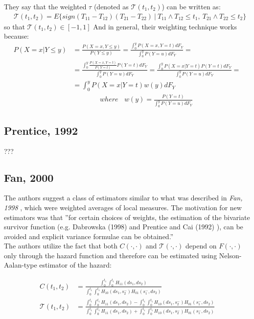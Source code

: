 \documentclass[]{article}
\begin{document}
They say that the weighted $\tau$ (denoted as $\mathcal{T}(t_1, t_2)$) can be written as:
	$$
	\begin{aligned}
		&\mathcal{T}(t_1, t_2) = E\{sign(T_{11} - T_{12}) (T_{21} - T_{22})~|~ T_{11}\wedge T_{12} \leq t_1,~T_{21}\wedge T_{22} \leq t_2  \}
	\end{aligned}
	$$
	so that $\mathcal{T}(t_1, t_2) \in [-1,1]$
And in general, their weighting technique works because:
	$$
	\begin{aligned}
		P(X=x|Y\leq y) &= \frac{P(X=x, Y\leq y)}{P(Y\leq y)} 
    =\frac{\int_0^y P(X=x, Y = t)dF_Y}{\int_0^y P(Y= u)dF_Y}  = \\
    &=\frac{\int_0^y \frac{P(X=x, Y = t)}{P(Y = t)}P(Y = t)dF_Y}{\int_0^y P(Y= u)dF_Y} =\frac{\int_0^y P(X=x | Y = t)P(Y = t)dF_Y}{\int_0^y P(Y= u)dF_Y}=\\
&=\int_0^y P(X=x | Y = t)w(y)dF_Y\\
&~~~~~~~~~~~~~~~~~~where~~~~w(y) = \frac{P(Y = t)}{\int_0^y P(Y= u)dF_Y}
	\end{aligned}
	$$

\subsection{Prentice, 1992 \cite{prentice1992covariance}}
???

\subsection{Fan, 2000 \cite{fan2000class}}
The authors suggest a class of estimators similar to what was described in \emph{Fan, 1998} \cite{fan2000dependence}, which were weighted averages of local measures. The motivation for new estimators was that ''for certain choices of weights, the estimation of the bivariate survivor function (e.g. Dabrowska (1998)\cite{dabrowska1988kaplan} and Prentice and Cai (1992) \cite{prentice1992covariance}), can be avoided and explicit variance formulae can be obtained.''\\
The authors utilize the fact that both $C(\cdot, \cdot)$ and $\mathcal{T}(\cdot, \cdot)$ depend on $F(\cdot, \cdot)$ only through the hazard function and therefore can be estimated using Nelson-Aalan-type estimator of the hazard:

	$$
	\begin{aligned}
    C(t_1, t_2) &= \frac{\int_0^{t_1}\int_0^{t_1} H_{11}(ds_1, ds_2)}{\int_0^{t_1}\int_0^{t_1} H_{10}(ds_1, s_2^-)H_{01}(s_1^-, ds_2)}\\
    \mathcal{T}(t_1, t_2) &= \frac{\int_0^{t_1}\int_0^{t_1} H_{11}(ds_1, ds_2) - \int_0^{t_1}\int_0^{t_1} H_{10}(ds_1, s_2^-)H_{01}(s_1^-, ds_2) }{\int_0^{t_1}\int_0^{t_1} H_{11}(ds_1, ds_2) + \int_0^{t_1}\int_0^{t_1} H_{10}(ds_1, s_2^-)H_{01}(s_1^-, ds_2) }\\
	\end{aligned}
	$$
\end{document}
